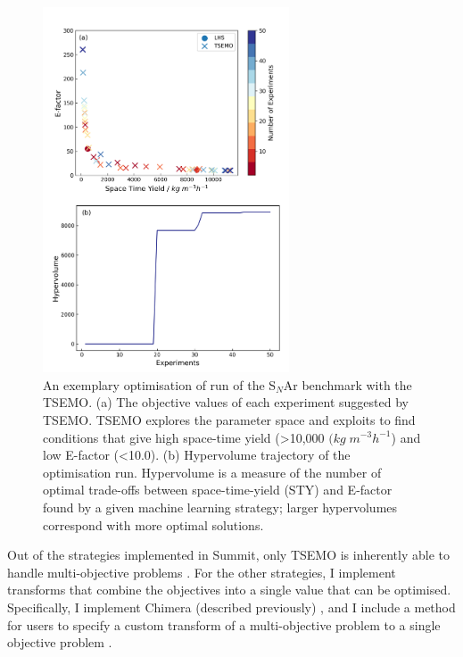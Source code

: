\begin{figure}
    \centering
    \includegraphics[width=0.65\textwidth]{gfx/Chapter03/snar_tsemo_pareto_hv.png}
    \caption{An exemplary optimisation of run of the S$_N$Ar benchmark with the TSEMO. (a) The objective values of each experiment suggested by TSEMO. TSEMO explores the parameter space and exploits to find conditions that give high space-time yield (>10,000 $(kg \; m^{-3} h^{-1}$) and low E-factor (<10.0). (b) Hypervolume trajectory of the optimisation run. Hypervolume is a measure of the number of optimal trade-offs between space-time-yield (STY) and E-factor found by a given machine learning strategy; larger hypervolumes correspond with more optimal solutions.}
    \label{fig:S$_N$Ar_tsemo}
\end{figure}

Out of the strategies implemented in Summit, only TSEMO is inherently able to handle multi-objective problems \cite{Bradford2018}. For the other strategies, I implement transforms that combine the objectives into a single value that can be optimised. Specifically, I implement Chimera (described previously) \cite{Hase2018b}, and I include a method for users to specify a custom transform of a multi-objective problem to a single objective problem \cite{Fitzpatrick2016, Epps2020}.

